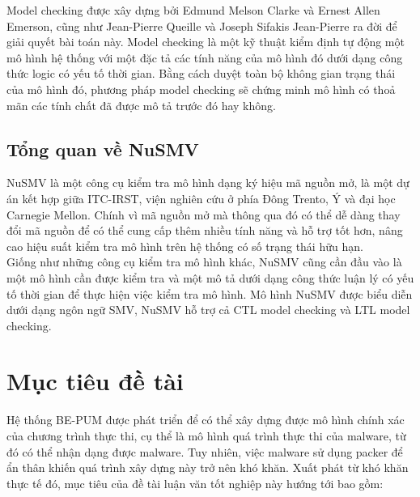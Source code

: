 \hspace{0.5cm}Model checking được xây dựng bởi Edmund Melson Clarke và Ernest Allen Emerson, cũng như Jean-Pierre Queille và Joseph Sifakis Jean-Pierre ra đời để giải quyết bài toán này. Model checking là một kỹ thuật kiểm định tự động một mô hình hệ thống với một đặc tả các tính năng của mô hình đó dưới dạng công thức logic có yếu tố thời gian. Bằng cách duyệt toàn bộ không gian trạng thái của mô hình đó, phương pháp model checking sẽ chứng minh mô hình có thoả mãn các tính chất đã được mô tả trước đó hay không.

\subsection{Tổng quan về NuSMV}

\hspace{0.5cm}NuSMV là một công cụ kiểm tra mô hình dạng ký hiệu mã nguồn mở, là một dự án kết hợp giữa ITC-IRST, viện nghiên cứu ở phía Đông Trento, Ý và đại học Carnegie Mellon. Chính vì mã nguồn mở mà thông qua đó có thể dễ dàng thay đổi mã nguồn để có thể cung cấp thêm nhiều tính năng và hỗ trợ tốt hơn, nâng cao hiệu suất kiểm tra mô hình trên hệ thống có số trạng thái hữu hạn.\\

\hspace{0.5cm}Giống như những công cụ kiểm tra mô hình khác, NuSMV cũng cần đầu vào là một mô hình cần được kiểm tra và một mô tả dưới dạng công thức luận lý có yếu tố thời gian để thực hiện việc kiểm tra mô hình. Mô hình NuSMV được biểu diễn dưới dạng ngôn ngữ SMV, NuSMV hỗ trợ cả CTL model checking và LTL model checking.

\section{Mục tiêu đề tài}

\hspace{0.5cm}Hệ thống BE-PUM được phát triển để có thể xây dựng được mô hình chính xác của chương trình thực thi, cụ thể là mô hình quá trình thực thi của malware, từ đó có thể nhận dạng được malware. Tuy nhiên, việc malware sử dụng packer để ẩn thân khiến quá trình xây dựng này trở nên khó khăn. Xuất phát từ khó khăn thực tế đó, mục tiêu của đề tài luận văn tốt nghiệp này hướng tới bao gồm:

